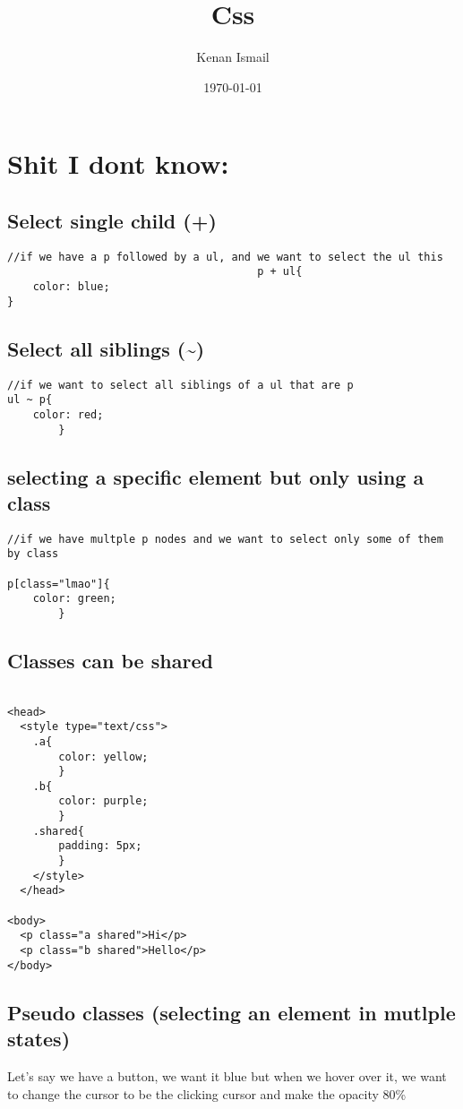 \documentclass[11pt]{article}
\author{Kenan Ismail}
\date{\today}
\title{Css}
\begin{document}
\maketitle
\tableofcontents

\section{Shit I dont know:}
\label{sec:org3ca466f}
\subsection{Select single child (+)}
\label{sec:org133b9a1}
\begin{verbatim}
//if we have a p followed by a ul, and we want to select the ul this
                                       p + ul{
    color: blue;
}
\end{verbatim}
\subsection{Select all siblings (\textasciitilde{})}
\label{sec:org34edb9d}
\begin{verbatim}
//if we want to select all siblings of a ul that are p
ul ~ p{
    color: red;
        }
\end{verbatim}
\subsection{selecting a specific element but only using a class}
\label{sec:orga4e1960}
\begin{verbatim}
//if we have multple p nodes and we want to select only some of them by class

p[class="lmao"]{
    color: green;
        }
\end{verbatim}
\subsection{Classes can be shared}
\label{sec:org9c799c7}
\begin{verbatim}

<head>
  <style type="text/css">
    .a{
        color: yellow;
        }
    .b{
        color: purple;
        }
    .shared{
        padding: 5px;
        }
    </style>
  </head>

<body>
  <p class="a shared">Hi</p>
  <p class="b shared">Hello</p>
</body>

\end{verbatim}
\subsection{Pseudo classes (selecting an element in mutlple states)}
\label{sec:org02c2688}
Let's say we have a button, we want it blue but when we hover over it, we want to change the cursor to be the clicking cursor and make the opacity 80\%
\end{document}
